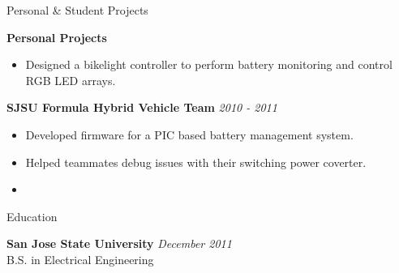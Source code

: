 \documentclass{resume} %
\begin{document}

\begin{rSection}{Personal \& Student Projects}

{\bf Personal Projects}
\begin{itemize}
\itemsep -0.5em \vspace{-0.5em}
\renewcommand{\labelitemi}{-}
\item Designed a bikelight controller to perform battery monitoring and control RGB LED arrays.
\end{itemize}

{\bf SJSU Formula Hybrid Vehicle Team} \hfill {\em 2010 - 2011}
\begin{itemize}
\itemsep -0.5em \vspace{-0.5em}
\renewcommand{\labelitemi}{-}
\item Developed firmware for a PIC based battery management system.
\item Helped teammates debug issues with their switching power coverter.
\item 
\end{itemize}

\end{rSection}


\begin{rSection}{Education}

{\bf San Jose State University} \hfill {\em December 2011} \\ 
B.S. in Electrical Engineering \\

\end{rSection}





\end{document}
